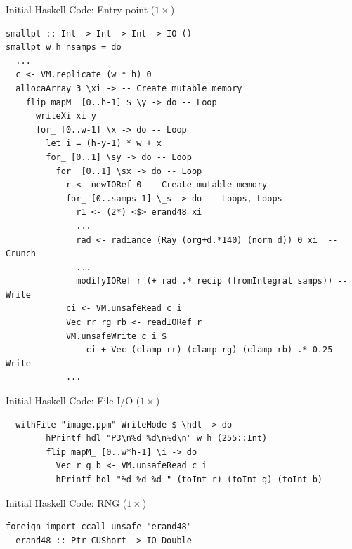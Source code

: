 \documentclass[8pt]{beamer}
\begin{document}
\begin{frame}[fragile]{Initial Haskell Code: Entry point  ($1\times$)}
\begin{verbatim}
smallpt :: Int -> Int -> Int -> IO ()
smallpt w h nsamps = do
  ...
  c <- VM.replicate (w * h) 0
  allocaArray 3 \xi -> -- Create mutable memory
    flip mapM_ [0..h-1] $ \y -> do -- Loop
      writeXi xi y
      for_ [0..w-1] \x -> do -- Loop
        let i = (h-y-1) * w + x
        for_ [0..1] \sy -> do -- Loop
          for_ [0..1] \sx -> do -- Loop
            r <- newIORef 0 -- Create mutable memory
            for_ [0..samps-1] \_s -> do -- Loops, Loops
              r1 <- (2*) <$> erand48 xi
              ...
              rad <- radiance (Ray (org+d.*140) (norm d)) 0 xi  -- Crunch
              ...
              modifyIORef r (+ rad .* recip (fromIntegral samps)) -- Write
            ci <- VM.unsafeRead c i
            Vec rr rg rb <- readIORef r
            VM.unsafeWrite c i $ 
                ci + Vec (clamp rr) (clamp rg) (clamp rb) .* 0.25 -- Write
            ...
\end{verbatim}

\end{frame}

\begin{frame}[fragile]{Initial Haskell Code: File I/O  ($1\times$)}
\begin{verbatim}
  withFile "image.ppm" WriteMode $ \hdl -> do
        hPrintf hdl "P3\n%d %d\n%d\n" w h (255::Int)
        flip mapM_ [0..w*h-1] \i -> do
          Vec r g b <- VM.unsafeRead c i
          hPrintf hdl "%d %d %d " (toInt r) (toInt g) (toInt b)
\end{verbatim}
\end{frame}

\begin{frame}[fragile]{Initial Haskell Code: RNG ($1\times$)}
\begin{verbatim}
foreign import ccall unsafe "erand48"
  erand48 :: Ptr CUShort -> IO Double
\end{verbatim}
\end{frame}
\end{document}
